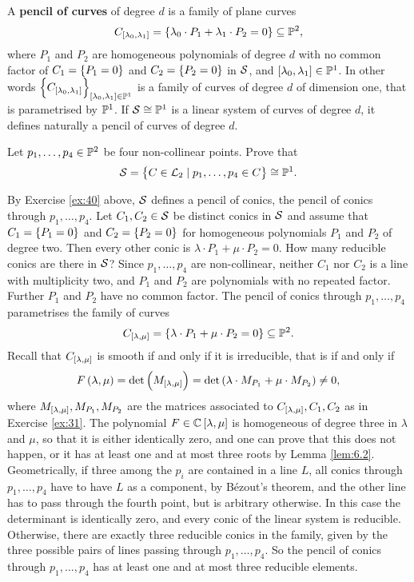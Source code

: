\begin{definition}
A \textbf{pencil of curves} of degree $ d $ is a family of plane curves
$$ C_{\sbr{\lambda_0, \lambda_1}} = \cbr{\lambda_0 \cdot P_1 + \lambda_1 \cdot P_2 = 0} \subseteq \P^2, $$
where $ P_1 $ and $ P_2 $ are homogeneous polynomials of degree $ d $ with no common factor of $ C_1 = \cbr{P_1 = 0} $ and $ C_2 = \cbr{P_2 = 0} $ in $ \SS $, and $ \sbr{\lambda_0, \lambda_1} \in \P^1 $. In other words $ \cbr{C_{\sbr{\lambda_0, \lambda_1}}}_{\sbr{\lambda_0, \lambda_1} \in \P^1} $ is a family of curves of degree $ d $ of dimension one, that is parametrised by $ \P^1 $. If $ \SS \cong \P^1 $ is a linear system of curves of degree $ d $, it defines naturally a pencil of curves of degree $ d $.
\end{definition}

\begin{exercise}
\label{ex:40}
Let $ p_1, \dots, p_4 \in \P^2 $ be four non-collinear points. Prove that
$$ \SS = \cbr{C \in \LL_2 \mid p_1, \dots, p_4 \in C} \cong \P^1. $$
\end{exercise}

\begin{example}
By Exercise \ref{ex:40} above, $ \SS $ defines a pencil of conics, the pencil of conics through $ p_1, \dots, p_4 $. Let $ C_1, C_2 \in \SS $ be distinct conics in $ \SS $ and assume that $ C_1 = \cbr{P_1 = 0} $ and $ C_2 = \cbr{P_2 = 0} $ for homogeneous polynomials $ P_1 $ and $ P_2 $ of degree two. Then every other conic is $ \lambda \cdot P_1 + \mu \cdot P_2 = 0 $. How many reducible conics are there in $ \SS $? Since $ p_1, \dots, p_4 $ are non-collinear, neither $ C_1 $ nor $ C_2 $ is a line with multiplicity two, and $ P_1 $ and $ P_2 $ are polynomials with no repeated factor. Further $ P_1 $ and $ P_2 $ have no common factor. The pencil of conics through $ p_1, \dots, p_4 $ parametrises the family of curves
$$ C_{\sbr{\lambda, \mu}} = \cbr{\lambda \cdot P_1 + \mu \cdot P_2 = 0} \subseteq \P^2. $$
Recall that $ C_{\sbr{\lambda, \mu}} $ is smooth if and only if it is irreducible, that is if and only if
$$ F\br{\lambda, \mu} = \det\br{M_{\sbr{\lambda, \mu}}} = \det\br{\lambda \cdot M_{P_1} + \mu \cdot M_{P_2}} \ne 0, $$
where $ M_{\sbr{\lambda, \mu}}, M_{P_1}, M_{P_2} $ are the matrices associated to $ C_{\sbr{\lambda, \mu}}, C_1, C_2 $ as in Exercise \ref{ex:31}. The polynomial $ F \in \C\sbr{\lambda, \mu} $ is homogeneous of degree three in $ \lambda $ and $ \mu $, so that it is either identically zero, and one can prove that this does not happen, or it has at least one and at most three roots by Lemma \ref{lem:6.2}. Geometrically, if three among the $ p_i $ are contained in a line $ L $, all conics through $ p_1, \dots, p_4 $ have to have $ L $ as a component, by B\'ezout's theorem, and the other line has to pass through the fourth point, but is arbitrary otherwise. In this case the determinant is identically zero, and every conic of the linear system is reducible. Otherwise, there are exactly three reducible conics in the family, given by the three possible pairs of lines passing through $ p_1, \dots, p_4 $. So the pencil of conics through $ p_1, \dots, p_4 $ has at least one and at most three reducible elements.
\end{example}

